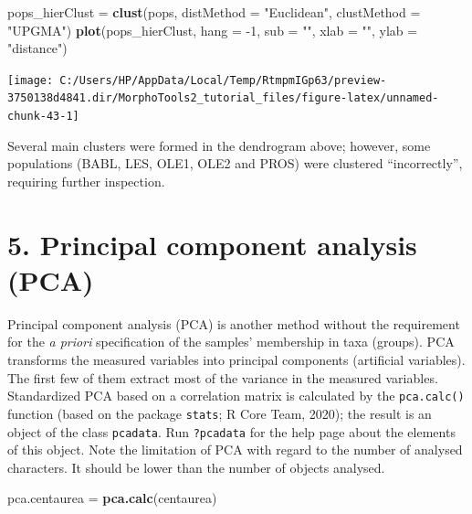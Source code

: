 \documentclass[
]{article}
\newenvironment{Shaded}{\begin{snugshade}}{\end{snugshade}}
\newcommand{\DataTypeTok}[1]{\textcolor[rgb]{0.13,0.29,0.53}{#1}}
\newcommand{\DecValTok}[1]{\textcolor[rgb]{0.00,0.00,0.81}{#1}}
\newcommand{\KeywordTok}[1]{\textcolor[rgb]{0.13,0.29,0.53}{\textbf{#1}}}
\newcommand{\NormalTok}[1]{#1}
\newcommand{\StringTok}[1]{\textcolor[rgb]{0.31,0.60,0.02}{#1}}
\begin{document}
\begin{Shaded}
\begin{Highlighting}[]
\NormalTok{pops_hierClust =}\StringTok{ }\KeywordTok{clust}\NormalTok{(pops, }\DataTypeTok{distMethod =} \StringTok{"Euclidean"}\NormalTok{, }\DataTypeTok{clustMethod =} \StringTok{"UPGMA"}\NormalTok{)}
\KeywordTok{plot}\NormalTok{(pops_hierClust, }\DataTypeTok{hang =} \DecValTok{-1}\NormalTok{, }\DataTypeTok{sub =} \StringTok{""}\NormalTok{, }\DataTypeTok{xlab =} \StringTok{""}\NormalTok{, }\DataTypeTok{ylab =} \StringTok{"distance"}\NormalTok{)}
\end{Highlighting}
\end{Shaded}

\begin{center}\texttt{[image: C:/Users/HP/AppData/Local/Temp/RtmpmIGp63/preview-3750138d4841.dir/MorphoTools2\_tutorial\_files/figure-latex/unnamed-chunk-43-1]} \end{center}

Several main clusters were formed in the dendrogram above; however, some
populations (BABL, LES, OLE1, OLE2 and PROS) were clustered
``incorrectly'', requiring further inspection.

\newpage

\hypertarget{principal-component-analysis-pca}{%
\section{5. Principal component analysis
(PCA)}\label{principal-component-analysis-pca}}

Principal component analysis (PCA) is another method without the
requirement for the \emph{a priori} specification of the samples'
membership in taxa (groups). PCA transforms the measured variables into
principal components (artificial variables). The first few of them
extract most of the variance in the measured variables. Standardized PCA
based on a correlation matrix is calculated by the \texttt{pca.calc()}
function (based on the package \texttt{stats}; R Core Team, 2020); the
result is an object of the class \texttt{pcadata}. Run \texttt{?pcadata}
for the help page about the elements of this object. Note the limitation
of PCA with regard to the number of analysed characters. It should be
lower than the number of objects analysed.

\begin{Shaded}
\begin{Highlighting}[]
\NormalTok{pca.centaurea =}\StringTok{ }\KeywordTok{pca.calc}\NormalTok{(centaurea)}
\end{Highlighting}
\end{Shaded}
\end{document}
